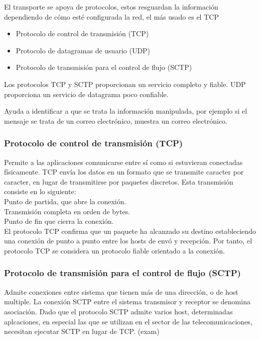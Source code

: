 \documentclass[letterpaper,12pt]{article}
\begin{document}
\begin{sloppypar}
El transporte se apoya de protocolos, estos resguardan la información dependiendo de cómo esté configurada la red, el más usado es el TCP
\begin{itemize}
    \item Protocolo de control de transmisión (TCP)
    \item Protocolo de datagramas de usuario (UDP)
    \item Protocolo de transmisión para el control de flujo (SCTP)
\end{itemize}
Los protocolos TCP y SCTP proporcionan un servicio completo y fiable. UDP proporciona un servicio de datagrama poco confiable.

Ayuda a identificar a que se trata la información manipulada, por ejemplo si el mensaje se trata de un correo electrónico, muestra un correo electrónico.

\subsubsection{Protocolo de control de transmisión (TCP)}
Permite a las aplicaciones comunicarse entre sí como si estuvieran conectadas físicamente. TCP envía los datos en un formato que se transmite caracter por caracter, en lugar de transmitirse por paquetes discretos. Esta transmisión consiste en lo siguiente: 
\vspace{0.3cm}\\ 
Punto de partida, que abre la conexión.
\vspace{0.3cm}\\ 
Transmisión completa en orden de bytes.
\vspace{0.3cm}\\ 
Punto de fin que cierra la conexión.
\vspace{0.3cm}\\ 
El protocolo TCP confirma que un paquete ha alcanzado su destino estableciendo una conexión de punto a punto entre los hosts de envó y recepción. Por tanto, el protocolo TCP se considera un protocolo fiable orientado a la conexión.

\subsubsection{Protocolo de transmisión para el control de flujo (SCTP)}
Admite conexiones entre sistema que tienen más de una dirección, o de host multiple. La conexión SCTP entre el sistema transmisor y receptor se denomina asociación. Dado que el protocolo SCTP admite varios host, determinadas aplcaciones, en especial las que se utilizan en el sector de las telecomunicaciones, necesitan ejecutar SCTP en lugar de TCP. (exam)


\end{sloppypar}
\end{document}
